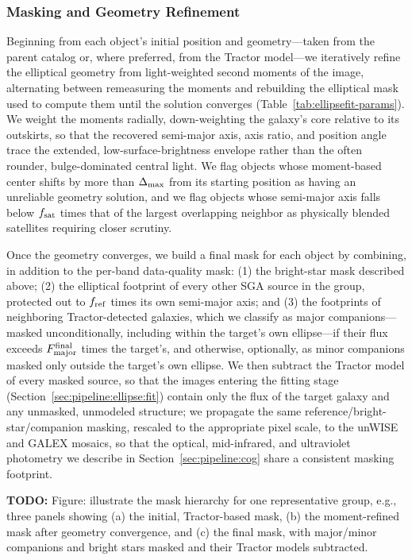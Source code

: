 \documentclass[modern,linenumbers]{aastex701}
\newcommand{\todo}[1]{{\color{red}\textbf{TODO:} #1}}
\begin{document}
\subsubsection{Masking and Geometry Refinement}
\label{sec:pipeline:ellipse:mask}

Beginning from each object's initial position and geometry---taken from
the parent catalog or, where preferred, from the Tractor model---we
iteratively refine the elliptical geometry from light-weighted second
moments of the image, alternating between remeasuring the moments and
rebuilding the elliptical mask used to compute them until the solution
converges (Table~\ref{tab:ellipsefit-params}). We weight the moments
radially, down-weighting the galaxy's core relative to its outskirts, so
that the recovered semi-major axis, axis ratio, and position angle trace
the extended, low-surface-brightness envelope rather than the often
rounder, bulge-dominated central light. We flag objects whose
moment-based center shifts by more than $\Delta_{\rm max}$ from its
starting position as having an unreliable geometry solution, and we flag
objects whose semi-major axis falls below $f_{\rm sat}$ times that of
the largest overlapping neighbor as physically blended satellites
requiring closer scrutiny.

Once the geometry converges, we build a final mask for each object by
combining, in addition to the per-band data-quality mask: (1) the
bright-star mask described above; (2) the elliptical footprint of every
other SGA source in the group, protected out to $f_{\rm ref}$ times its
own semi-major axis; and (3) the footprints of neighboring
Tractor-detected galaxies, which we classify as major companions---masked
unconditionally, including within the target's own ellipse---if
their flux exceeds $F_{\rm major}^{\rm final}$ times the target's, and
otherwise, optionally, as minor companions masked only outside the
target's own ellipse. We then subtract the Tractor model of every
masked source, so that the images entering the fitting stage
(Section~\ref{sec:pipeline:ellipse:fit}) contain only the flux of the
target galaxy and any unmasked, unmodeled structure; we propagate the
same reference/bright-star/companion masking, rescaled to the
appropriate pixel scale, to the unWISE and GALEX mosaics, so that the
optical, mid-infrared, and ultraviolet photometry we describe in
Section~\ref{sec:pipeline:cog} share a consistent masking footprint.

\todo{Figure: illustrate the mask hierarchy for one representative
  group, e.g., three panels showing (a) the initial, Tractor-based
  mask, (b) the moment-refined mask after geometry convergence, and (c)
  the final mask, with major/minor companions and bright stars masked
  and their Tractor models subtracted.}
\end{document}
